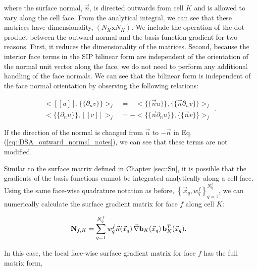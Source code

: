 \noindent where the surface normal, $\vec{n}$, is directed outwards from cell $K$ and is allowed to vary along the cell face. From the analytical integral, we can see that these matrices have dimensionality, $(N_K \text{x} N_K )$. We include the operation of the dot product between the outward normal and the basis function gradient for two reasons. First, it reduces the dimensionality of the matrices. Second, because the interior face terms in the SIP bilinear form are independent of the orientation of the normal unit vector along the face, we do not need to perform any additional handling of the face normals. We can see that the bilinear form is independent of the face normal orientation by observing the following relations:

\begin{equation}
\label{eq::DSA_outward_normal_notes}
\begin{aligned}
\Big<  [\![   u ]\!] , \{\!\{   \partial_n v \}\!\}\Big>_{f}  &= - \Big<  \{\!\{ \vec{n}  u \}\!\} , \{\!\{  \vec{n} \partial_n v \}\!\}\Big>_{f} \\
\Big< \{\!\{   \partial_n u \}\!\} ,  [\![   v ]\!]\Big>_{f} &= - \Big<  \{\!\{ \vec{n} \partial_n  u \}\!\} , \{\!\{  \vec{n} v \}\!\}\Big>_{f}
\end{aligned}.
\end{equation}

\noindent If the direction of the normal is changed from $\vec{n}$ to $-\vec{n}$ in Eq. (\ref{eq::DSA_outward_normal_notes}), we can see that these terms are not modified. 

Similar to the surface matrix defined in Chapter \ref{sec::Sn}, it is possible that the gradients of the basis functions cannot be integrated analytically along a cell face. Using the same face-wise quadrature notation as before, $\left\{  \vec{x}_q , w_q^{f}  \right\}_{q=1}^{N_q^f}$, we can numerically calculate the surface gradient matrix for face $f$ along cell $K$:

\begin{equation}
\label{eq::DSA_surface_gradient_matrix_numerical}
{\bf N}_{f,K} =    \sum_{q = 1}^{N_q^f} w_{q}^f \vec{n} (\vec{x}_q) \, \vec{\nabla} {\bf b}_K (\vec{x}_q) \, {\bf b}_K^T (\vec{x}_q) .
\end{equation}

In this case, the local face-wise surface gradient matrix for face $f$ has the full matrix form,


